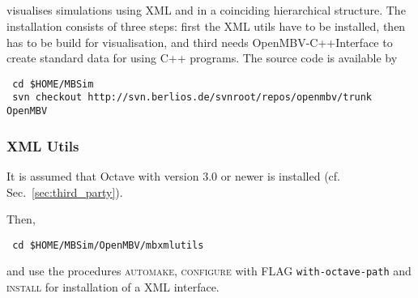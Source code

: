 \subsection{\OpenMBV{}}
\OpenMBV{} visualises \MBSim{} simulations using XML and \HDF{} in a coinciding hierarchical structure. The installation consists of three steps: first the XML utils have to be installed, then \OpenMBV{} has to be build for visualisation, and third \MBSim{} needs \textsf{OpenMBV-C++Interface} to create standard data for \OpenMBV{} using C++ programs. The source code is available by
\begin{verbatim}
 cd $HOME/MBSim
 svn checkout http://svn.berlios.de/svnroot/repos/openmbv/trunk OpenMBV
\end{verbatim}

\subsubsection{XML Utils}
It is assumed that Octave with version 3.0 or newer is installed (cf. Sec.~\ref{sec:third_party}).\par
Then,
\begin{verbatim}
 cd $HOME/MBSim/OpenMBV/mbxmlutils
\end{verbatim} 
and use the procedures \textsc{automake}, \textsc{configure} with FLAG \texttt{\-\-with-octave-path} and \textsc{install} for installation of a XML interface. 

